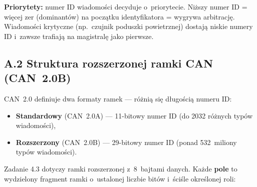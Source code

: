\documentclass[12pt,a4paper]{article}
\begin{document}
\textbf{Priorytety:} numer ID wiadomości decyduje o~priorytecie.
Niższy numer ID = więcej zer (dominantów) na początku identyfikatora =
wygrywa arbitrację. Wiadomości krytyczne (np.\ czujnik poduszki powietrznej)
dostają niskie numery ID i~zawsze trafiają na magistralę jako pierwsze.

\subsection*{A.2 Struktura rozszerzonej ramki CAN (CAN~2.0B)}

CAN~2.0 definiuje dwa formaty ramek — różnią się długością numeru ID:
\begin{itemize}
    \item \textbf{Standardowy} (CAN~2.0A) — 11-bitowy numer ID
          (do 2032 różnych typów wiadomości),
    \item \textbf{Rozszerzony} (CAN~2.0B) — 29-bitowy numer ID
          (ponad 532~miliony typów wiadomości).
\end{itemize}

Zadanie 4.3 dotyczy ramki rozszerzonej z~8~bajtami danych.
Każde \textbf{pole} to wydzielony fragment ramki o~ustalonej liczbie bitów
i~ściśle określonej roli:
\end{document}
